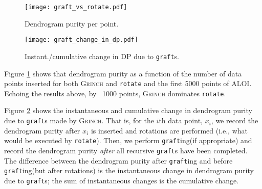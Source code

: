 \documentclass{article} \usepackage[utf8]{inputenc} \usepackage[T1]{fontenc}    \usepackage{hyperref}       \usepackage{url}            \usepackage{booktabs}       \usepackage{amsfonts}       \usepackage{nicefrac}       \usepackage{microtype}      \usepackage{geometry}
\newcommand{\alg}{\textsc{Grinch}\xspace}
\newcommand{\grafting}{\texttt{graft}ing\xspace}
\newcommand{\grafts}{\texttt{graft}s\xspace}
\newcommand{\rotate}{\texttt{rotate}\xspace}
\begin{document}
\begin{figure*}[t]
	\captionsetup[subfigure]{justification=centering}
	\begin{subfigure}[h]{0.49\textwidth}
		\centerline{\texttt{[image: graft\_vs\_rotate.pdf]}}
		\caption{Dendrogram purity per point.}
		\label{fig:cost}
	\end{subfigure}
	\begin{subfigure}[h]{0.49\textwidth}
		\centerline{\texttt{[image: graft\_change\_in\_dp.pdf]}}
		\caption{Instant./cumulative change in DP due to \grafts.}
		\label{fig:grafts}
	\end{subfigure}
	\caption{Figure \ref{fig:cost} shows the dendrogram purity of
          two trees, one built by \alg and the other built by \rotate,
          on the first 5000 points of ALOI. The dendrogram purity of
          the tree built \alg is greater than that of the tree built
          by \rotate. Figure \ref{fig:grafts} plots the instantaneous
          and cumulative change in dendrogram purity due to
          \grafts. While \alg achieves ~3\% larger dendrogram purity
          than \rotate}
\end{figure*}
 
Figure \ref{fig:cost} shows that dendrogram purity as a function of
the number of data points inserted for both \alg and \rotate and the
first 5000 points of ALOI. Echoing the results above, by ~1000 points,
\alg dominates \rotate.

Figure \ref{fig:grafts} shows the instantaneous and cumulative change
in dendrogram purity due to \grafts made by \alg. That is, for the
$i$th data point, $x_i$, we record the dendrogram purity after $x_i$
is inserted and rotations are performed (i.e., what would be executed
by \rotate). Then, we perform \grafting (if appropriate) and record
the dendrogram purity \emph{after} all recursive \grafts have been
completed. The difference between the dendrogram purity after
\grafting and before \grafting (but after rotations) is the
instantaneous change in dendrogram purity due to \grafts; the sum of
instantaneous changes is the cumulative change.
\end{document}

